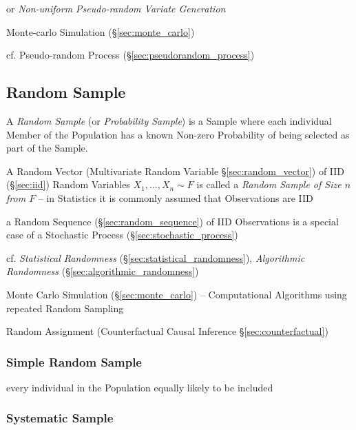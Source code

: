 or \emph{Non-uniform Pseudo-random Variate Generation}

Monte-carlo Simulation (\S\ref{sec:monte_carlo})

cf. Pseudo-random Process (\S\ref{sec:pseudorandom_process})



\subsection{Random Sample}\label{sec:random_sample}

A \emph{Random Sample} (or \emph{Probability Sample}) is a Sample where each
individual Member of the Population has a known Non-zero Probability of being
selected as part of the Sample.

A Random Vector (Multivariate Random Variable \S\ref{sec:random_vector}) of IID
(\S\ref{sec:iid}) Random Variables $X_1, \ldots, X_n \sim F$ is called a
\emph{Random Sample of Size $n$ from $F$} -- in Statistics it is commonly
assumed that Observations are IID

 a Random Sequence (\S\ref{sec:random_sequence}) of IID Observations is a
 special case of a Stochastic Process (\S\ref{sec:stochastic_process})

\fist cf. \emph{Statistical Randomness} (\S\ref{sec:statistical_randomness}),
\emph{Algorithmic Randomness} (\S\ref{sec:algorithmic_randomness})

\fist Monte Carlo Simulation (\S\ref{sec:monte_carlo}) -- Computational
Algorithms using repeated Random Sampling

\fist Random Assignment (Counterfactual Causal Inference
\S\ref{sec:counterfactual})



\subsubsection{Simple Random Sample}\label{sec:simple_random_sample}

every individual in the Population equally likely to be included



\subsubsection{Systematic Sample}\label{sec:systematic_sample}

